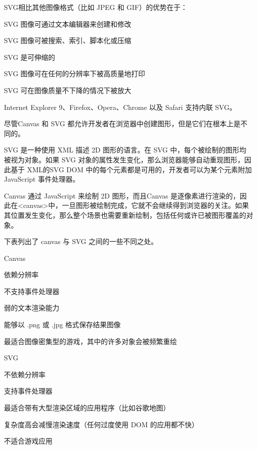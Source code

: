 SVG相比其他图像格式（比如 JPEG 和 GIF）的优势在于：

\begin{compactitem}
\item SVG 图像可通过文本编辑器来创建和修改
\item SVG 图像可被搜索、索引、脚本化或压缩
\item SVG 是可伸缩的
\item SVG 图像可在任何的分辨率下被高质量地打印
\item SVG 可在图像质量不下降的情况下被放大
\end{compactitem}

Internet Explorer 9、Firefox、Opera、Chrome 以及 Safari 支持内联 SVG。

尽管Canvas 和 SVG 都允许开发者在浏览器中创建图形，但是它们在根本上是不同的。



SVG 是一种使用 XML 描述 2D 图形的语言。在 SVG 中，每个被绘制的图形均被视为对象。如果 SVG 对象的属性发生变化，那么浏览器能够自动重现图形，因此基于 XML的SVG DOM 中的每个元素都是可用的，开发者可以为某个元素附加 JavaScript 事件处理器。

Canvas 通过 JavaScript 来绘制 2D 图形，而且Canvas 是逐像素进行渲染的，因此在<canvas>中，一旦图形被绘制完成，它就不会继续得到浏览器的关注。如果其位置发生变化，那么整个场景也需要重新绘制，包括任何或许已被图形覆盖的对象。


下表列出了 canvas 与 SVG 之间的一些不同之处。

\begin{compactitem}
\item Canvas
	\begin{compactitem}
	\item 依赖分辨率
	\item 不支持事件处理器
	\item 弱的文本渲染能力
	\item 能够以 .png 或 .jpg 格式保存结果图像
	\item 最适合图像密集型的游戏，其中的许多对象会被频繁重绘
	\end{compactitem}
\item SVG
	\begin{compactitem}
	\item 不依赖分辨率
	\item 支持事件处理器
	\item 最适合带有大型渲染区域的应用程序（比如谷歌地图）
	\item 复杂度高会减慢渲染速度（任何过度使用 DOM 的应用都不快）
	\item 不适合游戏应用
	\end{compactitem}
\end{compactitem}




